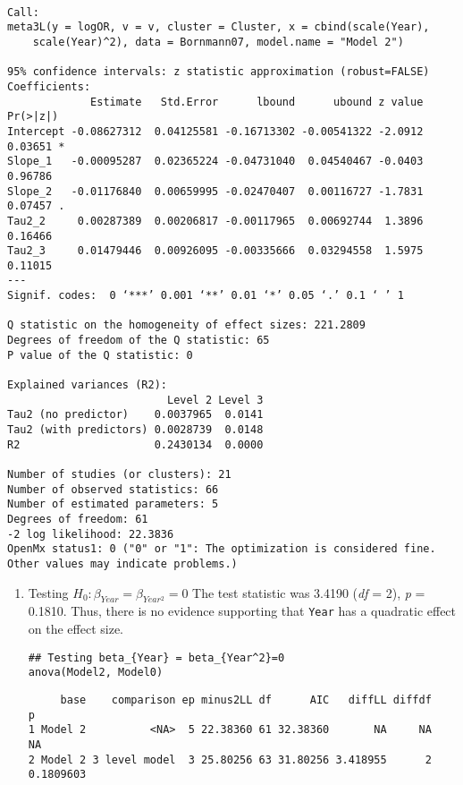\documentclass[11pt]{article}
\begin{document}
\begin{verbatim}

Call:
meta3L(y = logOR, v = v, cluster = Cluster, x = cbind(scale(Year), 
    scale(Year)^2), data = Bornmann07, model.name = "Model 2")

95% confidence intervals: z statistic approximation (robust=FALSE)
Coefficients:
             Estimate   Std.Error      lbound      ubound z value Pr(>|z|)  
Intercept -0.08627312  0.04125581 -0.16713302 -0.00541322 -2.0912  0.03651 *
Slope_1   -0.00095287  0.02365224 -0.04731040  0.04540467 -0.0403  0.96786  
Slope_2   -0.01176840  0.00659995 -0.02470407  0.00116727 -1.7831  0.07457 .
Tau2_2     0.00287389  0.00206817 -0.00117965  0.00692744  1.3896  0.16466  
Tau2_3     0.01479446  0.00926095 -0.00335666  0.03294558  1.5975  0.11015  
---
Signif. codes:  0 ‘***’ 0.001 ‘**’ 0.01 ‘*’ 0.05 ‘.’ 0.1 ‘ ’ 1

Q statistic on the homogeneity of effect sizes: 221.2809
Degrees of freedom of the Q statistic: 65
P value of the Q statistic: 0

Explained variances (R2):
                         Level 2 Level 3
Tau2 (no predictor)    0.0037965  0.0141
Tau2 (with predictors) 0.0028739  0.0148
R2                     0.2430134  0.0000

Number of studies (or clusters): 21
Number of observed statistics: 66
Number of estimated parameters: 5
Degrees of freedom: 61
-2 log likelihood: 22.3836 
OpenMx status1: 0 ("0" or "1": The optimization is considered fine.
Other values may indicate problems.)
\end{verbatim}

\begin{enumerate}
\item Testing \(H_0: \beta_{Year} = \beta_{Year^2}=0\)
\label{sec:orgb96a81d}
The test statistic was 3.4190 (\emph{df} = 2), \emph{p} = 0.1810. Thus, there is no evidence supporting that \texttt{Year} has a quadratic effect on the effect size.
\begin{verbatim}
## Testing beta_{Year} = beta_{Year^2}=0
anova(Model2, Model0)
\end{verbatim}

\begin{verbatim}
     base    comparison ep minus2LL df      AIC   diffLL diffdf         p
1 Model 2          <NA>  5 22.38360 61 32.38360       NA     NA        NA
2 Model 2 3 level model  3 25.80256 63 31.80256 3.418955      2 0.1809603
\end{verbatim}
\end{enumerate}
\end{document}
